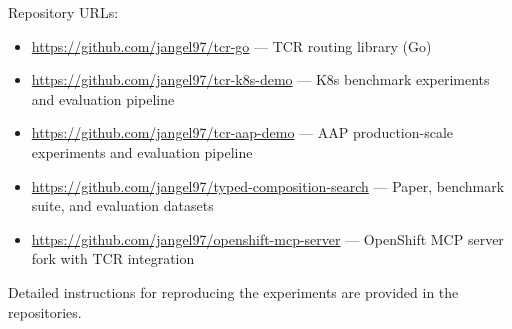\documentclass{article}
\begin{document}
\noindent Repository URLs:
\begin{itemize}[leftmargin=*,nosep]
  \item \url{https://github.com/jangel97/tcr-go} --- TCR routing library (Go)
  \item \url{https://github.com/jangel97/tcr-k8s-demo} --- K8s benchmark experiments and evaluation pipeline
  \item \url{https://github.com/jangel97/tcr-aap-demo} --- AAP production-scale experiments and evaluation pipeline
  \item \url{https://github.com/jangel97/typed-composition-search} --- Paper, benchmark suite, and evaluation datasets
  \item \url{https://github.com/jangel97/openshift-mcp-server} --- OpenShift MCP server fork with TCR integration
\end{itemize}

\noindent Detailed instructions for reproducing the experiments are provided in the repositories.


\FloatBarrier


\end{document}
